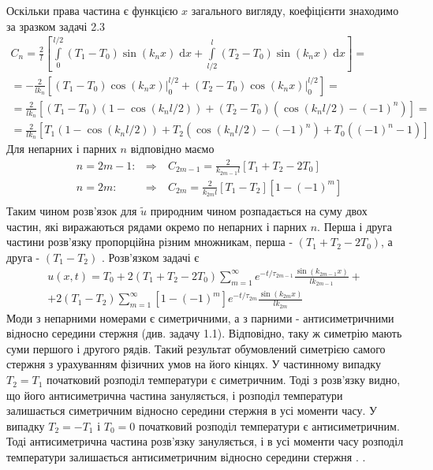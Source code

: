 Оскільки права частина є функцією $x$ загального вигляду, коефіцієнти знаходимо за зразком задачі 2.3 
\begin{equation*}
    \begin{gathered}
        C_n = \frac{2}{l}\left[\int\limits_0^{l/2} (T_1 - T_0)\sin(k_n x) \;\mathrm{d}x + \int\limits_{l/2}^l (T_2 - T_0)\sin(k_n x) \;\mathrm{d}x\right] =\\
        = - \frac{2}{lk_n}\left[(T_1 - T_0)\cos(k_n x)\biggr\rvert_0^{l/2} + (T_2 - T_0)\cos(k_n x)\biggr\rvert_0^{l/2}\right] =\\
        = \frac{2}{lk_n}\left[(T_1 - T_0)(1 - \cos(k_n l/2)) + (T_2 - T_0)(\cos(k_n l/2) - (-1)^n)\right] =\\
        = \frac{2}{lk_n}\left[T_1(1 - \cos(k_n l/2)) + T_2(\cos(k_n l/2) - (-1)^n) + T_0 ((-1)^n - 1)\right]
    \end{gathered}
\end{equation*}
Для непарних і парних $n$ відповідно маємо
\begin{equation*}
    \begin{aligned}
        &n = 2m - 1: &\Rightarrow&\ C_{2m-1} = \frac{2}{k_{2m-1}l}\left[T_1 + T_2 - 2T_0 \right]\\
        &n=2m: &\Rightarrow&\ C_{2m} = \frac{2}{k_{2m}l}\left[T_1 - T_2 \right] [1 - (-1)^m]\\
       \end{aligned}    
\end{equation*}
Таким чином розв'язок для $\widetilde{u}$ природним чином розпадається на суму двох частин, які виражаються рядами окремо по непарних і парних $n$.  Перша і друга частини розв'язку пропорційна різним множникам, перша - $(T_1 + T_2 - 2T_0)$, а друга - $(T_1 - T_2)$ .  Розв'язком задачі є
\begin{equation}
    \begin{aligned}
        u(x,t) = T_0 +  
2 (T_1 + T_2 - 2T_0) \sum_{m=1}^{\infty} e^{-t/\tau_{2m-1}} \frac{\sin(k_{2m-1} x)}{l k_{2m-1}} +\\
+  
2 (T_1 - T_2) \sum_{m=1}^{\infty} [1 - (-1)^m] e^{-t/\tau_{2m}} \frac{\sin(k_{2m} x)}{l k_{2m}} 
    \end{aligned}
\end{equation}
Моди з непарними номерами є симетричними, а з парними - антисиметричними відносно середини стержня (див. задачу 1.1). Відповідно, таку ж симетрію мають суми першого і другого рядів. Такий результат обумовлений симетрією самого стержня з урахуванням фізичних умов на його кінцях. У частинному випадку $T_2 = T_1$  початковий розподіл температури є симетричним. Тоді з розв'язку видно, що його антисиметрична частина зануляється, і розподіл температури залишається симетричним відносно середини стержня в усі моменти часу. У випадку $T_2 = - T_1$ і  $T_0 = 0$ початковий розподіл температури є антисиметричним. Тоді антисиметрична частина розв'язку зануляється, і в усі моменти часу розподіл температури залишається антисиметричним відносно середини стержня . .


